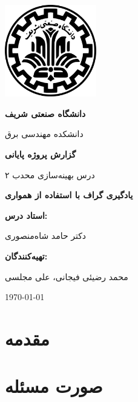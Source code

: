 \documentclass[12pt,onecolumn,a4paper]{article}
\begin{document}
	\begin{titlepage}
		\begin{center}
			
			\includegraphics[width=4cm]{assets/logo-sharif.png} %
			
			\vspace{1cm}
			
			{\huge \textbf{دانشگاه صنعتی شریف}}  
			
			\vspace{0.5cm}
			
			{\Large دانشکده مهندسی برق}
			
			\vspace{1.5cm}
			
			{\Huge \textbf{گزارش پروژه پایانی}} 
			
			\vspace{0.5cm}
			
			{\Large درس بهینه‌سازی محدب ۲}
			
			\vspace{1.5cm}
			
			{\Huge \textbf{یادگیری گراف با استفاده از همواری}}
			
			\vspace{1.5cm}
			
			\textbf{\Large استاد درس:}  
			
			\vspace{0.5cm}
			
			{\Large دکتر حامد شاه‌منصوری}
			
			\vspace{1.5cm}
			
			\textbf{\Large تهیه‌کنندگان:}  
			
			\vspace{0.5cm}
			
			{\Large محمد رضیئی فیجانی، علی مجلسی}
			
			\vfill
			
			{\Large \today}
			
		\end{center}
	\end{titlepage}
	


    \section{مقدمه}
    
    
    \section{صورت مسئله}
    
    
    
    
    
	\nocite{*}
\end{document}
